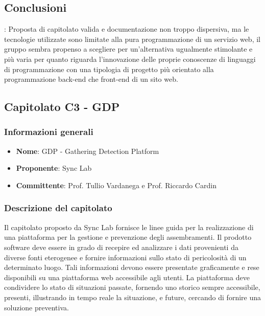 		\subsection{Conclusioni}:
			Proposta di capitolato valida e documentazione non troppo dispersiva, ma le tecnologie utilizzate sono limitate alla pura programmazione di un servizio web, il gruppo sembra propenso a scegliere per un’alternativa ugualmente stimolante e più varia per quanto riguarda l’innovazione delle proprie conoscenze di linguaggi di programmazione con una tipologia di progetto più orientato alla programmazione back-end che front-end di un sito web.
\newpage
				
	\subsection{Capitolato C3 - GDP}
		\subsubsection{Informazioni generali}
			\begin{itemize}
				\item\textbf{Nome}: GDP - Gathering Detection Platform
				\item\textbf{Proponente}: Sync Lab
				\item\textbf{Committente}: Prof. Tullio Vardanega e Prof. Riccardo Cardin
			\end{itemize}
			
		\subsubsection{Descrizione del capitolato}
			Il capitolato proposto da Sync Lab fornisce le linee guida per la realizzazione di una piattaforma per la gestione e prevenzione degli assembramenti. 
			Il prodotto software deve essere in grado di recepire ed analizzare i dati provenienti da diverse fonti eterogenee e fornire informazioni sullo stato di pericolosità di un determinato luogo.
			Tali informazioni devono essere presentate graficamente e rese disponibili su una piattaforma web accessibile agli utenti. La piattaforma deve condividere lo stato di situazioni passate, fornendo uno storico sempre accessibile, presenti, illustrando in tempo reale la situazione, e future, cercando di fornire una soluzione preventiva.
